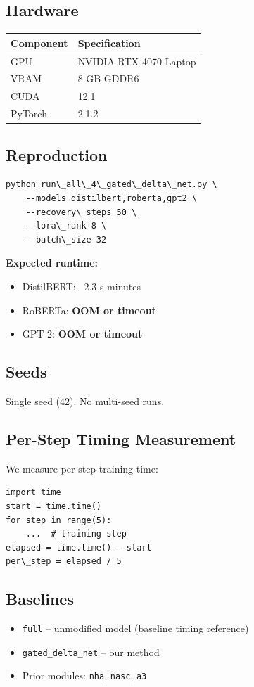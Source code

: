 \subsection{Hardware}

\begin{table}[H]
\centering
\small
\begin{tabular}{ll}
\toprule
\textbf{Component} & \textbf{Specification} \\
\midrule
GPU & NVIDIA RTX 4070 Laptop \\
VRAM & 8 GB GDDR6 \\
CUDA & 12.1 \\
PyTorch & 2.1.2 \\
\bottomrule
\end{tabular}
\end{table}

\subsection{Reproduction}

\begin{lstlisting}
python run\_all\_4\_gated\_delta\_net.py \
    --models distilbert,roberta,gpt2 \
    --recovery\_steps 50 \
    --lora\_rank 8 \
    --batch\_size 32
\end{lstlisting}

\textbf{Expected runtime:}
\begin{itemize}
\item DistilBERT: ~2.3 s minutes
\item RoBERTa: \textbf{OOM or timeout}
\item GPT-2: \textbf{OOM or timeout}

\end{itemize}
\subsection{Seeds}

Single seed (42). No multi-seed runs.

\subsection{Per-Step Timing Measurement}

We measure per-step training time:

\begin{lstlisting}
import time
start = time.time()
for step in range(5):
    ...  # training step
elapsed = time.time() - start
per\_step = elapsed / 5
\end{lstlisting}

\subsection{Baselines}

\begin{itemize}
\item \texttt{full} -- unmodified model (baseline timing reference)
\item \texttt{gated\_delta\_net} -- our method
\item Prior modules: \texttt{nha}, \texttt{nasc}, \texttt{a3}

\end{itemize}
